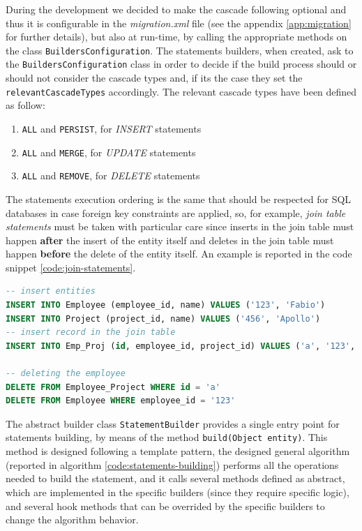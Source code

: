 \noindent During the development we decided to make the cascade following optional and thus it is configurable in the \textit{migration.xml} file (see the appendix \ref{app:migration} for further details), but also at run-time, by calling the appropriate methods on the class \texttt{BuildersConfiguration}. The statements builders, when created, ask to the \texttt{BuildersConfiguration} class in order to decide if the build process should or should not consider the cascade types and, if its the case they set the \texttt{relevantCascadeTypes} accordingly.
The relevant cascade types have been defined as follow:
\begin{enumerate}
\item \texttt{ALL} and \texttt{PERSIST}, for \textit{INSERT} statements
\item \texttt{ALL} and \texttt{MERGE}, for \textit{UPDATE} statements
\item \texttt{ALL} and \texttt{REMOVE}, for \textit{DELETE} statements
\end{enumerate}
\noindent The statements execution ordering is the same that should be respected for SQL databases in case foreign key constraints are applied, so, for example, \textit{join table statements} must be taken with particular care since inserts in the join table must happen \textbf{after} the insert of the entity itself and deletes in the join table must happen \textbf{before} the delete of the entity itself. An example is reported in the code snippet \ref{code:join-statements}.

\begin{lstlisting}[language=SQL, caption=Join table statements ordering example, label=code:join-statements]
-- insert entities
INSERT INTO Employee (employee_id, name) VALUES ('123', 'Fabio')
INSERT INTO Project (project_id, name) VALUES ('456', 'Apollo')
-- insert record in the join table
INSERT INTO Emp_Proj (id, employee_id, project_id) VALUES ('a', '123', '456')

-- deleting the employee
DELETE FROM Employee_Project WHERE id = 'a'
DELETE FROM Employee WHERE employee_id = '123'
\end{lstlisting}

\newparagraph The abstract builder class \texttt{StatementBuilder} provides a single entry point for statements building, by means of the method \texttt{build(Object entity)}. This method is designed following a template pattern, the designed general algorithm (reported in algorithm \ref{code:statements-building}) performs all the operations needed to build the statement, and it calls several methods defined as abstract, which are implemented in the specific builders (since they require specific logic), and several hook methods that can be overrided by the specific builders to change the algorithm behavior.

